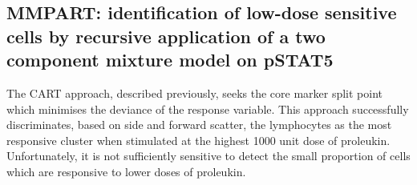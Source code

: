 
%

\clearpage


\subsection{MMPART: identification of low-dose sensitive cells by recursive application of a two component mixture model on pSTAT5}

The CART approach, described previously, seeks the core marker split point which minimises the deviance of the response variable.
This approach successfully discriminates, based on side and forward scatter, the lymphocytes as the most responsive cluster
when stimulated at the highest 1000 unit dose of proleukin.
Unfortunately, it is not sufficiently sensitive to detect the small proportion of cells which are responsive to lower doses of proleukin.

